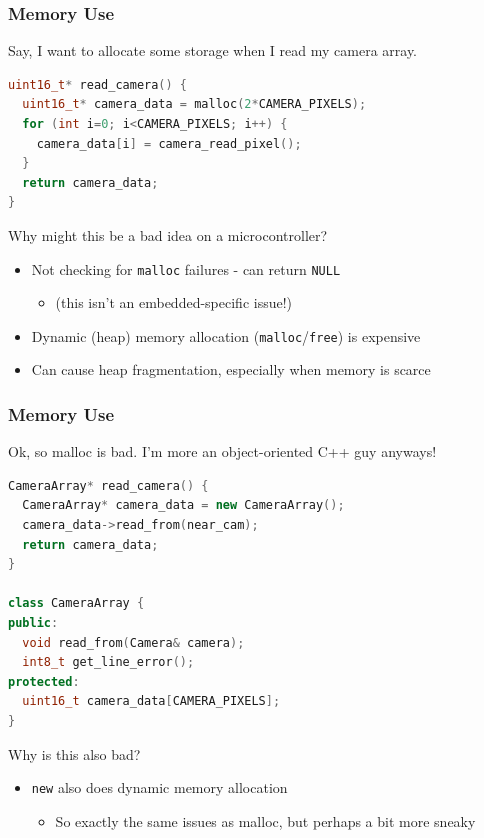 \documentclass{beamer}
\begin{document}
\begin{frame}[fragile]
\frametitle{Memory Use}
Say, I want to allocate some storage when I read my camera array.
\vspace{10px}
\begin{lstlisting}[language=C++,basicstyle=\ttfamily\scriptsize]
uint16_t* read_camera() {
  uint16_t* camera_data = malloc(2*CAMERA_PIXELS);
  for (int i=0; i<CAMERA_PIXELS; i++) {
    camera_data[i] = camera_read_pixel();
  }
  return camera_data;
}
\end{lstlisting}
\vspace{10px}
Why might this be a bad idea on a microcontroller?
\begin{itemize}
  \item<2> Not checking for \texttt{malloc} failures - can return \texttt{NULL}
  \begin{itemize}
    \item (this isn't an embedded-specific issue!)
  \end{itemize}
  \item<2> Dynamic (heap) memory allocation (\texttt{malloc}/\texttt{free}) is expensive
  \item<2> Can cause heap fragmentation, especially when memory is scarce
\end{itemize}
\end{frame}

\begin{frame}[fragile]
\frametitle{Memory Use}
Ok, so malloc is bad. I'm more an object-oriented C++ guy anyways!
\vspace{10px}
\begin{lstlisting}[language=C++,basicstyle=\ttfamily\scriptsize]
CameraArray* read_camera() {
  CameraArray* camera_data = new CameraArray();
  camera_data->read_from(near_cam);
  return camera_data;
}

class CameraArray {
public:
  void read_from(Camera& camera);
  int8_t get_line_error();
protected:
  uint16_t camera_data[CAMERA_PIXELS];
}
\end{lstlisting}
\vspace{10px}
Why is this also bad?
\begin{itemize}
  \item<2> \texttt{new} also does dynamic memory allocation
  \begin{itemize}
    \item So exactly the same issues as malloc, but perhaps a bit more sneaky
  \end{itemize}
\end{itemize}
\end{frame}
\end{document}
